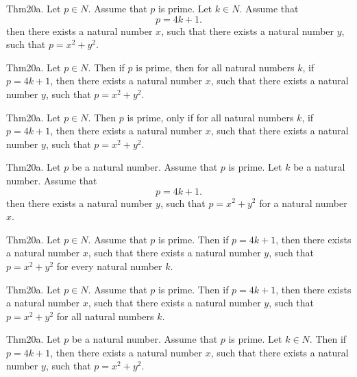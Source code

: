 \documentclass{article}
\begin{document}
Thm20a. Let $p \in N$. Assume that $p$ is prime. Let $k \in N$. Assume that $$p = 4 k + 1.$$ then there exists a natural number $x$, such that there exists a natural number $y$, such that $p = x ^{ 2}+ y ^{ 2}$.

Thm20a. Let $p \in N$. Then if $p$ is prime, then for all natural numbers $k$, if $p = 4 k + 1$, then there exists a natural number $x$, such that there exists a natural number $y$, such that $p = x ^{ 2}+ y ^{ 2}$.

Thm20a. Let $p \in N$. Then $p$ is prime, only if for all natural numbers $k$, if $p = 4 k + 1$, then there exists a natural number $x$, such that there exists a natural number $y$, such that $p = x ^{ 2}+ y ^{ 2}$.

Thm20a. Let $p$ be a natural number. Assume that $p$ is prime. Let $k$ be a natural number. Assume that $$p = 4 k + 1.$$ then there exists a natural number $y$, such that $p = x ^{ 2}+ y ^{ 2}$ for a natural number $x$.

Thm20a. Let $p \in N$. Assume that $p$ is prime. Then if $p = 4 k + 1$, then there exists a natural number $x$, such that there exists a natural number $y$, such that $p = x ^{ 2}+ y ^{ 2}$ for every natural number $k$.

Thm20a. Let $p \in N$. Assume that $p$ is prime. Then if $p = 4 k + 1$, then there exists a natural number $x$, such that there exists a natural number $y$, such that $p = x ^{ 2}+ y ^{ 2}$ for all natural numbers $k$.

Thm20a. Let $p$ be a natural number. Assume that $p$ is prime. Let $k \in N$. Then if $p = 4 k + 1$, then there exists a natural number $x$, such that there exists a natural number $y$, such that $p = x ^{ 2}+ y ^{ 2}$.
\end{document}
